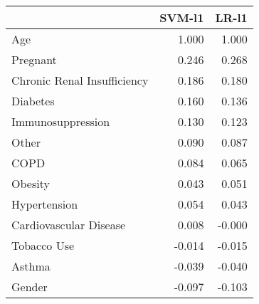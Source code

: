 \begin{tabular}{lrr}
\toprule
{} &  SVM-l1 &  LR-l1 \\
\midrule
Age                         &   1.000 &  1.000 \\
Pregnant                    &   0.246 &  0.268 \\
Chronic Renal Insufficiency &   0.186 &  0.180 \\
Diabetes                    &   0.160 &  0.136 \\
Immunosuppression           &   0.130 &  0.123 \\
Other                       &   0.090 &  0.087 \\
COPD                        &   0.084 &  0.065 \\
Obesity                     &   0.043 &  0.051 \\
Hypertension                &   0.054 &  0.043 \\
Cardiovascular Disease      &   0.008 & -0.000 \\
Tobacco Use                 &  -0.014 & -0.015 \\
Asthma                      &  -0.039 & -0.040 \\
Gender                      &  -0.097 & -0.103 \\
\bottomrule
\end{tabular}
